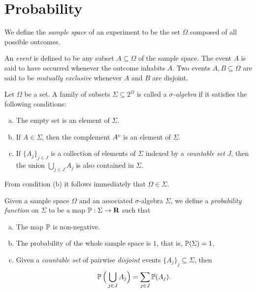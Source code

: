 \section{Probability}

\begin{definition}
    \label{def:sample-space}
    We define the \emph{sample space} of an experiment to be the set \(\Omega\)
    composed of all possible outcomes.

    An \emph{event} is defined to be any subset \(A \subseteq \Omega\) of the sample
    space. The event \(A\) is said to have occurred whenever the outcome inhabits
    \(A\). Two events \(A, B \subseteq \Omega\) are said to be \emph{mutually
        exclusive} whenever \(A\) and \(B\) are disjoint.
\end{definition}

\begin{definition}
    \label{def:sigma-algebra}
    Let \(\Omega\) be a set. A family of subsets \(\Sigma \subseteq 2^{\Omega}\) is called
    a \emph{\(\sigma\)-algebra} if it satisfies the following conditions:
    \begin{enumerate}[(a)]\setlength\itemsep{0em}
        \item The empty set is an element of \(\Sigma\).
        \item If \(A \in \Sigma\), then the complement \({A}^{\text{c}}\) is an
              element of \(\Sigma\).
        \item If \(\{A_j\}_{j \in J}\) is a collection of elements of \(\Sigma\)
              indexed by a \emph{countable set} \(J\), then the union
              \(\bigcup_{j \in J} A_j\) is also contained in \(\Sigma\).
    \end{enumerate}
    From condition (b) it follows immediately that \(\Omega \in \Sigma\).
\end{definition}

\begin{definition}
    \label{def:probability-function}
    Given a sample space \(\Omega\) and an associated \(\sigma\)-algebra \(\Sigma\),
    we define a \emph{probability function} on \(\Sigma\) to be a map
    \(\operatorname{\mathbb{P}}: \Sigma \to \mathbf{R}\) such that
    \begin{enumerate}[(a)]\setlength\itemsep{0em}
        \item The map \(\operatorname{\mathbb{P}}\) is non-negative.
        \item The probability of the whole sample space is \(1\), that is,
              \(\operatorname{\mathbb{P}}(\Sigma) = 1\).
        \item Given a \emph{countable set} of pairwise \emph{disjoint} events
              \(\{A_j\}_{j} \subseteq \Sigma\), then
              \[
                  \operatorname{\mathbb{P}}\Big( \bigcup_{j \in J} A_j \Big) = \sum_{j \in J} \operatorname{\mathbb{P}}(A_j).
              \]
    \end{enumerate}
\end{definition}

